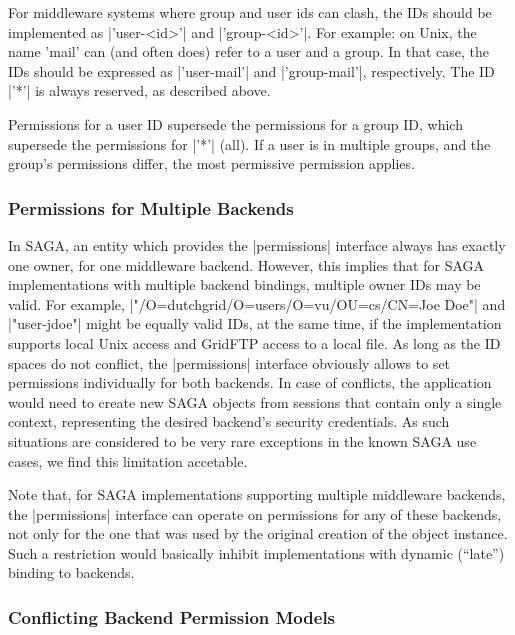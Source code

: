  
 
  For middleware systems where group and user ids can clash, the
  IDs should be implemented as |'user-<id>'| and |'group-<id>'|.
  For example: on Unix, the name 'mail' can (and often does)
  refer to a user and a group.  In that case, the IDs should be
  expressed as |'user-mail'| and |'group-mail'|, respectively.
  The ID |'*'| is always reserved, as described above.
 
  Permissions for a user ID supersede the permissions for a
  group ID, which supersede the permissions for |'*'| (all).  If
  a user is in multiple groups, and the group's permissions
  differ, the most permissive permission applies.
 
 
 \subsubsection{Permissions for Multiple Backends}
 
  In SAGA, an entity which provides the |permissions| interface
  always has exactly one owner, for one middleware backend.
  However, this implies that for SAGA implementations with
  multiple backend bindings, multiple owner IDs may be valid.
  For example, |"/O=dutchgrid/O=users/O=vu/OU=cs/CN=Joe Doe"|
  and |"user-jdoe"| might be equally valid IDs, at the same
  time, if the implementation supports local Unix access and
  GridFTP access to a local file.  As long as the ID spaces do
  not conflict, the |permissions| interface obviously allows to
  set permissions individually for both backends. In case of conflicts,
  the application would need to create new SAGA objects from
  sessions that contain only a single context, representing the
  desired backend's security credentials.  As such situations are
  considered to be very rare exceptions in the known SAGA use cases, we
  find this limitation accetable.
 
  Note that, for SAGA implementations supporting multiple
  middleware backends, the |permissions| interface can operate
  on permissions for any of these backends, not only for the one
  that was used by the original creation of the object
  instance.  Such a restriction would basically inhibit implementations
  with dynamic (``late'') binding to backends.
 
 
 \subsubsection*{Conflicting Backend Permission Models}
 
